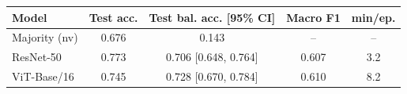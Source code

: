 \begin{tabular}{@{}lcccc@{}}
\toprule
Model & Test acc. & Test bal. acc. [95\% CI] & Macro F1 & min/ep. \\ \midrule
Majority (nv) & 0.676 & 0.143 & -- & -- \\
ResNet-50 & 0.773 & 0.706 [0.648, 0.764] & 0.607 & 3.2 \\
ViT-Base/16 & 0.745 & 0.728 [0.670, 0.784] & 0.610 & 8.2 \\
\bottomrule
\end{tabular}
